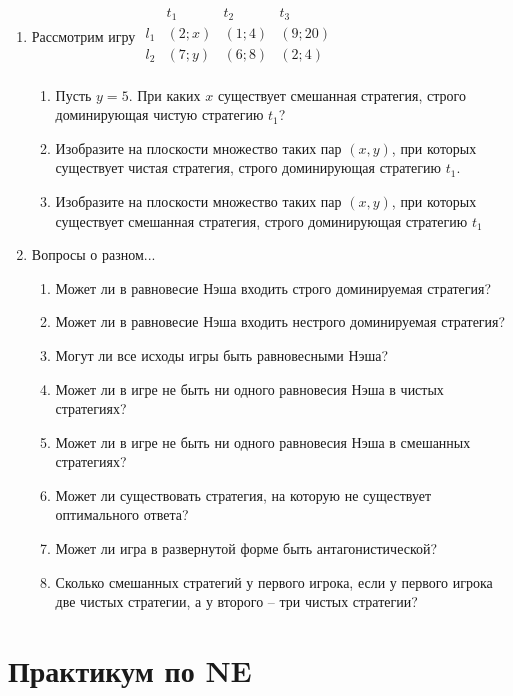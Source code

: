 \documentclass[pdftex,12pt,a4paper]{article}
\begin{document}
\begin{enumerate}
\item Рассмотрим игру $\begin{array}{c|ccc}
    {} &  {t_1 } & {t_2 } & {t_3 }   \\
\hline
    {l_1 } &  {\left( {2;x} \right)} & {\left( {1;4} \right)} & {\left( {9;20} \right)}   \\
    {l_2 } &  {\left( {7;y} \right)} & {\left( {6;8} \right)} & {\left( {2;4} \right)}   \\
\end{array}$
\begin{enumerate}
\item Пусть $y = 5$. При каких $x$  существует смешанная стратегия, строго доминирующая чистую стратегию $t_1 $? 
\item Изобразите на плоскости множество таких пар $\left( {x,y} \right)$, при которых существует чистая стратегия, строго доминирующая стратегию $t_1 $. 
\item Изобразите на плоскости множество таких пар $\left( {x,y} \right)$, при которых существует смешанная стратегия, строго доминирующая стратегию $t_1 $ 
\end{enumerate}

\item Вопросы о разном... 
\begin{enumerate}
\item Может ли в равновесие Нэша входить строго доминируемая стратегия? 
\item Может ли в равновесие Нэша входить нестрого доминируемая стратегия? 
\item Могут ли все исходы игры быть равновесными Нэша? 
\item Может ли в игре не быть ни одного равновесия Нэша в чистых стратегиях? 
\item Может ли в игре не быть ни одного равновесия Нэша в смешанных стратегиях? 
\item Может ли существовать стратегия, на которую не существует оптимального ответа? 
\item Может ли игра в развернутой форме быть антагонистической?
\item Сколько смешанных стратегий у первого игрока, если у первого игрока две чистых стратегии, а у второго – три чистых стратегии?
\end{enumerate}

\end{enumerate}
\section{Практикум по NE}
\end{document}
